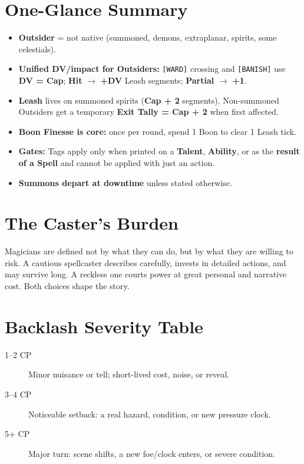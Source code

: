 \section{One-Glance Summary}

\begin{itemize}
  \item \textbf{Outsider} = not native (summoned, demons, extraplanar, spirits, some celestials).
  \item \textbf{Unified DV/impact for Outsiders:} \texttt{[WARD]} crossing and \texttt{[BANISH]} use \textbf{DV = Cap}; \textbf{Hit} $\rightarrow$ \textbf{+DV} Leash segments; \textbf{Partial} $\rightarrow$ \textbf{+1}.
  \item \textbf{Leash} lives on summoned spirits (\textbf{Cap + 2} segments). Non-summoned Outsiders get a temporary \textbf{Exit Tally = Cap + 2} when first affected.
  \item \textbf{Boon Finesse is core:} once per round, spend 1 Boon to clear 1 Leash tick.
  \item \textbf{Gates:} Tags apply only when printed on a \textbf{Talent}, \textbf{Ability}, or as the \textbf{result of a Spell} and cannot be applied with just an action.
  \item \textbf{Summons depart at downtime} unless stated otherwise.
\end{itemize}

\section{The Caster's Burden}

Magicians are defined not by what they can do, but by what they are willing to risk. A cautious spellcaster describes carefully, invests in detailed actions, and may survive long. A reckless one courts power at great personal and narrative cost. Both choices shape the story.

\section{Backlash Severity Table}

\begin{description}
\item[1--2 CP] Minor nuisance or tell; short-lived cost, noise, or reveal.
\item[3--4 CP] Noticeable setback: a real hazard, condition, or new pressure clock.
\item[5+ CP] Major turn: scene shifts, a new foe/clock enters, or severe condition.
\end{description}

